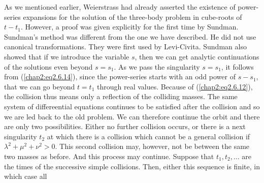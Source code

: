 As we mentioned earlier, Weierstrass had already asserted the existence of power-series expansions for the solution of the three-body problem in cube-roots of $t - t_1$. However, a proof was given explicitly for the first time by Sundman. Sundman's method was different from the one we have described. He did not use canonical transformations. They were first used by Levi-Civita. Sundman also showed that if we introduce the variable $s$, then we can get analytic continuations of the solutions even beyond $s = s_1$. As we pass the singularity $s =s_1$, it follows from (\ref{chap2:eq2.6.14}), since the power-series starts with an odd power of $s -s_1$, that we can go beyond $t =t_1$ through real values. Because of (\ref{chap2:eq2.6.12}), the collision thus means only a reflection of the colliding masses. The same system of differeential equations continues to be satisfied after the collision and so we are led back to the old problem. We can therefore continue the orbit and there are only two possibilities. Either no further collision occurs, or there is a next singularity $t_2$ at which there is a collision which cannot be a general collision if $\lambda^2 + \mu^2 + \nu^2 >0$. This second collision may, however, not be between the same two masses as before. And this process may continue. Suppose that $t_1, t_2, \ldots$ are the times of the successive simple collisions. Then, either this sequence is finite, in which case all 
